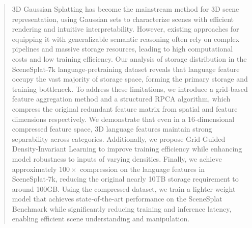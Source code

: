 \documentclass[runningheads]{llncs}
\begin{document}
\begin{abstract}
  3D Gaussian Splatting has become the mainstream method for 3D scene representation, using Gaussian sets to characterize scenes with efficient rendering and intuitive interpretability. However, existing approaches for equipping it with generalizable semantic reasoning often rely on complex pipelines and massive storage resources, leading to high computational costs and low training efficiency. Our analysis of storage distribution in the SceneSplat‑7k language-pretraining dataset reveals that language feature occupy the vast majority of storage space, forming the primary storage and training bottleneck. To address these limitations, we introduce a grid‑based feature aggregation method and a structured RPCA algorithm, which compress the original redundant  feature matrix from spatial and feature dimensions respectively. We demonstrate that even in a 16‑dimensional compressed feature space, 3D language features maintain strong separability across categories. Additionally, we propose Grid‑Guided Density‑Invariant Learning to improve training efficiency while enhancing model robustness to inputs of varying densities. Finally, we achieve approximately $100\times$ compression on the language features in SceneSplat‑7k, reducing the original nearly 10TB storage requirement to around 100GB. Using the compressed dataset, we train a lighter‑weight model that achieves state‑of‑the‑art performance on the SceneSplat Benchmark while significantly reducing training and inference latency, enabling efficient scene understanding and manipulation.
\end{abstract}
\end{document}
